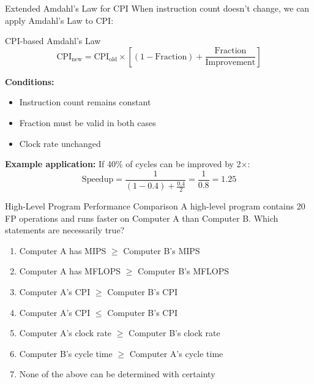 \documentclass[aspectratio=169,12pt]{beamer}
\begin{document}
\begin{frame}{Extended Amdahl's Law for CPI}
When instruction count doesn't change, we can apply Amdahl's Law to CPI:

\begin{block}{CPI-based Amdahl's Law}
$$\text{CPI}_{\text{new}} = \text{CPI}_{\text{old}} \times \left[(1 - \text{Fraction}) + \frac{\text{Fraction}}{\text{Improvement}}\right]$$
\end{block}

\textbf{Conditions:}
\begin{itemize}
    \item Instruction count remains constant
    \item Fraction must be valid in both cases
    \item Clock rate unchanged
\end{itemize}

\textbf{Example application:}
If 40\% of cycles can be improved by 2×:
$$\text{Speedup} = \frac{1}{(1 - 0.4) + \frac{0.4}{2}} = \frac{1}{0.8} = 1.25$$
\end{frame}

\begin{frame}{High-Level Program Performance Comparison}
A high-level program contains 20 FP operations and runs faster on Computer A than Computer B. Which statements are necessarily true?

\begin{enumerate}
    \item Computer A has MIPS $\geq$ Computer B's MIPS
    \item Computer A has MFLOPS $\geq$ Computer B's MFLOPS
    \item Computer A's CPI $\geq$ Computer B's CPI
    \item Computer A's CPI $\leq$ Computer B's CPI
    \item Computer A's clock rate $\geq$ Computer B's clock rate
    \item Computer B's cycle time $\geq$ Computer A's cycle time
    \item None of the above can be determined with certainty
\end{enumerate}\end{frame}
\end{document}
